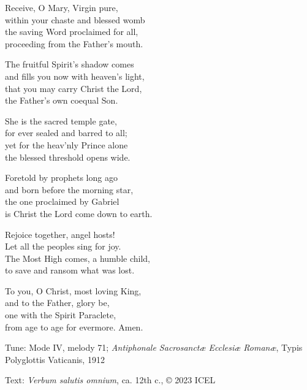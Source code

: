 \hymn

\settowidth{\versewidth}{and fills you now with heaven’s light,}

\begin{hymnverse}[\versewidth]
Receive, O Mary, Virgin pure,\\
within your chaste and blessed womb\\
the saving Word proclaimed for all,\\
proceeding from the Father’s mouth.

The fruitful Spirit’s shadow comes\\
and fills you now with heaven’s light,\\
that you may carry Christ the Lord,\\
the Father’s own coequal Son.

She is the sacred temple gate,\\
for ever sealed and barred to all;\\
yet for the heav’nly Prince alone\\
the blessed threshold opens wide.

Foretold by prophets long ago\\
and born before the morning star,\\
the one proclaimed by Gabriel\\
is Christ the Lord come down to earth.

Rejoice together, angel hosts!\\
Let all the peoples sing for joy.\\
The Most High comes, a humble child,\\
to save and ransom what was lost.

To you, O Christ, most loving King,\\
and to the Father, glory be,\\
one with the Spirit Paraclete,\\
from age to age for evermore. Amen.
\end{hymnverse}

\begin{hymnsource}
Tune: Mode IV, melody 71; \emph{Antiphonale Sacrosanctæ Ecclesiæ Romanæ}, Typis Polyglottis Vaticanis, 1912

Text: \emph{Verbum salutis omnium}, ca. 12th c., © 2023 ICEL
\end{hymnsource}